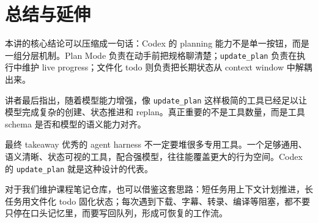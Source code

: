 \documentclass[a4paper]{article}
\begin{document}
\section{总结与延伸}

本讲的核心结论可以压缩成一句话：Codex 的 planning 能力不是单一按钮，而是一组分层机制。Plan Mode 负责在动手前把规格聊清楚；\texttt{update\_plan} 负责在执行中维护 live progress；文件化 todo 则负责把长期状态从 context window 中解耦出来。

讲者最后指出，随着模型能力增强，像 \texttt{update\_plan} 这样极简的工具已经足以让模型完成复杂的创建、状态推进和 replan。真正重要的不是工具数量，而是工具 schema 是否和模型的语义能力对齐。

\begin{importantbox}{最终 takeaway}
优秀的 agent harness 不一定要堆很多专用工具。一个足够通用、语义清晰、状态可视的工具，配合强模型，往往能覆盖更大的行为空间。Codex 的 \texttt{update\_plan} 就是这种设计的代表。
\end{importantbox}

对于我们维护课程笔记仓库，也可以借鉴这套思路：短任务用上下文计划推进，长任务用文件化 todo 固化状态；每次遇到下载、字幕、转录、编译等阻塞，都不要只停在口头记忆里，而要写回队列，形成可恢复的工作流。
\end{document}
